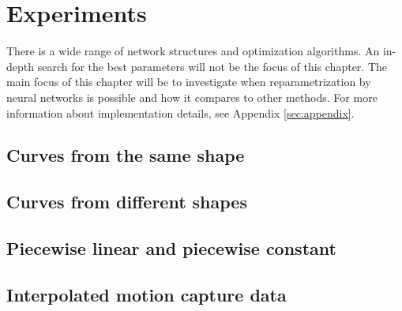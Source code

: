 
\section{Experiments}
There is a wide range of network structures and optimization algorithms. An in-depth search for the best parameters will not be the focus of this chapter. The main focus of this chapter will be to investigate when reparametrization by neural networks is possible and how it compares to other methods. For more information about implementation details, see Appendix \ref{sec:appendix}.




\subsection{Curves from the same shape}\label{subsec:case_1}


\FloatBarrier
\subsection{Curves from different shapes}\label{subsec:case_2}


\FloatBarrier
\subsection{Piecewise linear and piecewise constant}


\FloatBarrier
\subsection{Interpolated motion capture data}

